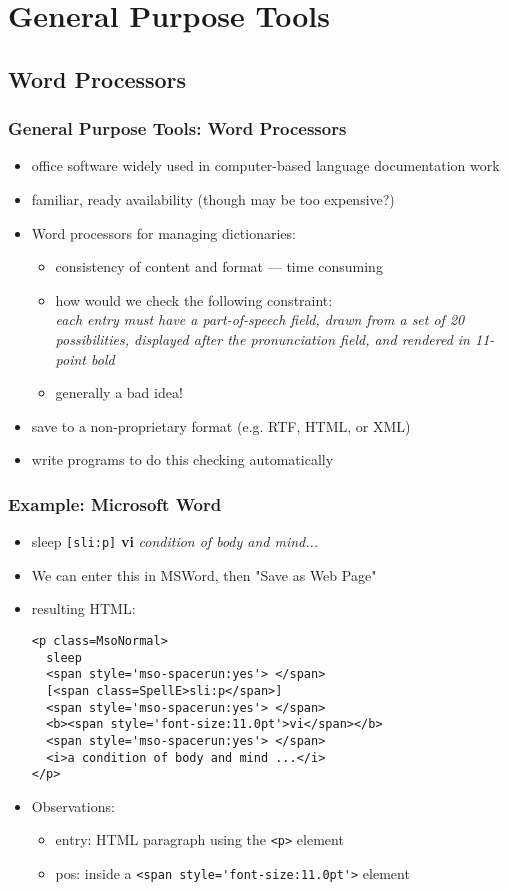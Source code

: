 \documentclass{beamer}             %
\begin{document}
\section{General Purpose Tools}

\subsection{Word Processors}

\begin{frame}
\frametitle{General Purpose Tools: Word Processors}

\begin{itemize}
\item office software widely used in computer-based language
  documentation work
\item familiar, ready availability (though may be too expensive?)
\item Word processors for managing dictionaries:
  \begin{itemize}
  \item consistency of content and format --- time consuming
  \item how would we check the following constraint: \\
    \textit{each entry must have a part-of-speech field, drawn from a set of 20
     possibilities, displayed after the pronunciation field, and rendered
     in 11-point bold}
  \item generally a bad idea!
  \end{itemize}
\item save to a non-proprietary format (e.g. RTF, HTML, or XML)
\item write programs to do this checking automatically
\end{itemize}
\end{frame}

\begin{frame}[fragile]
\frametitle{Example: Microsoft Word}
\small
\begin{itemize}
\item sleep \verb|[sli:p]| \textbf{vi} \textit{condition of body and mind...}
\item We can enter this in MSWord, then "Save as Web Page"
\item resulting HTML:

\begin{verbatim}
<p class=MsoNormal>
  sleep
  <span style='mso-spacerun:yes'> </span>
  [<span class=SpellE>sli:p</span>]
  <span style='mso-spacerun:yes'> </span>
  <b><span style='font-size:11.0pt'>vi</span></b>
  <span style='mso-spacerun:yes'> </span>
  <i>a condition of body and mind ...</i>
</p>
\end{verbatim}

\item Observations:
  \begin{itemize}
  \item entry: HTML paragraph using the \verb|<p>| element
  \item pos: inside a \verb|<span style='font-size:11.0pt'>| element
  \end{itemize}
\end{itemize}
\end{frame}
\end{document}
